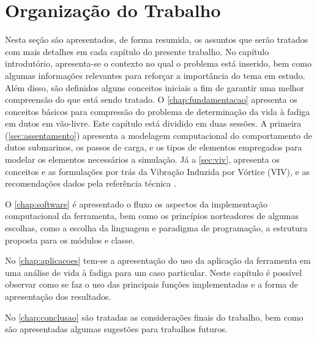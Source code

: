 \section{Organização do Trabalho}

Nesta seção são apresentados, de forma resumida, os assuntos que serão tratados com mais detalhes em cada capítulo do presente trabalho. No capítulo introdutório, apresenta-se o contexto no qual o problema está inserido, bem como algumas informações relevantes para reforçar a importância do tema em estudo. Além disso, são definidos alguns conceitos iniciais a fim de garantir uma melhor compreensão do que está sendo tratado.
O \autoref{chap:fundamentacao} apresenta os conceitos básicos para compressão do problema de determinação da vida à fadiga em dutos em vão-livre. Este capítulo está dividido em duas sessões. A primeira (\autoref{sec:assentamento}) apresenta a modelagem computacional do comportamento de dutos submarinos, os passos de carga, e os tipos de elementos empregados para modelar os elementos necessários a simulação. Já a \autoref{sec:viv}, apresenta os conceitos e as formulações por trás da Vibração Induzida por Vórtice (VIV), e as recomendações dados pela referência técnica .

O \autoref{chap:software} é apresentado o fluxo  os aspectos da implementação computacional da ferramenta, bem como os princípios norteadores de algumas escolhas, como a escolha da linguagem e paradigma de programação, a estrutura proposta para os módulos e classe.

No \autoref{chap:aplicacoes} tem-se a apresentação do uso da aplicação da ferramenta em uma análise de vida à fadiga para um caso particular. Neste capítulo é possível observar como se faz o uso das principais funções implementadas e a forma de apresentação dos resultados.

No \autoref{chap:conclusao} são tratadas as considerações finais do trabalho, bem como são apresentadas algumas sugestões para trabalhos futuros.